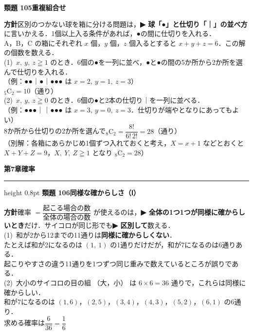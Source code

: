 \documentclass[a4paper,11pt]{ltjsarticle}
\newcommand{\ans}[2]{\Needspace{5\baselineskip}\vspace{6pt}%
  {\sffamily\bfseries 類題 #1\quad #2}\par}
\newcommand{\point}[1]{\textsf{\bfseries ▶ #1}}
\newcommand{\shouans}[2]{\Needspace{8\baselineskip}\vspace{10pt}\markboth{解答\quad #1\quad #2}{}%
  {\sffamily\bfseries\Large #1\quad #2\par}\vspace{2pt}\hrule height 0.8pt\vspace{2pt}}
\begin{document}
\ans{105}{重複組合せ}
\begin{kai}
\textbf{方針}\quad 区別のつかない球を箱に分ける問題は，\point{球「●」と仕切り「｜」の並べ方}に言いかえる．1個以上入る条件があれば，●の間に仕切りを入れる．\\[2pt]
A，B，C の箱にそれぞれ $x$ 個，$y$ 個，$z$ 個入るとすると $x+y+z=6$．この解の個数を数える．\\[2pt]
(1)\ $x,\ y,\ z\geqq1$ のとき．6個の●を一列に並べ，●と●の間の5か所から2か所を選んで仕切りを入れる．\\
\hspace*{1.5em}（例：●●｜●｜●●● は $x=2,\ y=1,\ z=3$）\\
\hspace*{1.5em}${}_5\mathrm C_2=10$（通り）\\[2pt]
(2)\ $x,\ y,\ z\geqq0$ のとき．6個の●と2本の仕切り｜を一列に並べる．\\
\hspace*{1.5em}（例：●●●｜｜●●● は $x=3,\ y=0,\ z=3$．仕切りが端やとなりにあってもよい）\\
\hspace*{1.5em}8か所から仕切りの2か所を選んで\quad ${}_8\mathrm C_2=\dfrac{8!}{6!\,2!}=28$（通り）\\[2pt]
\hspace*{1.5em}（別解：各箱にあらかじめ1個ずつ入れておくと考え，$X=x+1$ などとおくと $X+Y+Z=9$，$X,\ Y,\ Z\geqq1$ となり ${}_8\mathrm C_2=28$）
\end{kai}

\shouans{第7章}{確率}
\ans{106}{同様な確からしさ（Ⅰ）}
\begin{kai}
\textbf{方針}\quad 確率 $=\dfrac{\text{起こる場合の数}}{\text{全体の場合の数}}$ が使えるのは，\point{全体の1つ1つが同様に確からしいとき}だけ．サイコロが同じ形でも\point{区別して}数える．\\[2pt]
(1)\ 和が2から12までの11通りは\textbf{同様に確からしくない}．\\
\hspace*{1.5em}たとえば和が2になるのは $(1,\ 1)$ の1通りだけだが，和が7になるのは6通りある．\\
\hspace*{1.5em}起こりやすさの違う11通りを1つずつ同じ重みで数えているところが誤りである．\\[2pt]
(2)\ 大小のサイコロの目の組 （大，小） は $6\times6=36$ 通りで，これらは同様に確からしい．\\
\hspace*{1.5em}和が7になるのは $(1,6)$，$(2,5)$，$(3,4)$，$(4,3)$，$(5,2)$，$(6,1)$ の6通り．\\
\hspace*{1.5em}求める確率は\quad $\dfrac{6}{36}=\dfrac16$
\end{kai}
\end{document}
